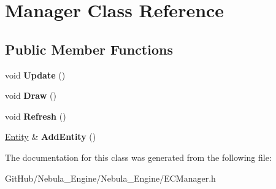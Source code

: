 \hypertarget{class_manager}{}\section{Manager Class Reference}
\label{class_manager}
\subsection*{Public Member Functions}
\begin{DoxyCompactItemize}
\item 
\mbox{\label{class_manager_a151953c44ccb959ebd1b2889b925f1b3}} 
void {\bfseries Update} ()
\item 
\mbox{\label{class_manager_a9dc4d1fdbaaf539b7cc35480f9867996}} 
void {\bfseries Draw} ()
\item 
\mbox{\label{class_manager_a11c02a8633940b318429f07b6844ea2f}} 
void {\bfseries Refresh} ()
\item 
\mbox{\label{class_manager_abb799be00c20efbb5c1fbe5b96901706}} 
\mbox{\hyperlink{class_entity}{Entity}} \& {\bfseries Add\+Entity} ()
\end{DoxyCompactItemize}


The documentation for this class was generated from the following file\+:\begin{DoxyCompactItemize}
\item 
Git\+Hub/\+Nebula\+\_\+\+Engine/\+Nebula\+\_\+\+Engine/E\+C\+Manager.\+h\end{DoxyCompactItemize}
